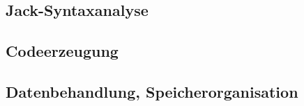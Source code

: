 \documentclass[12pt]{report}
\begin{document}
\subsection{Jack-Syntaxanalyse}
\subsection{Codeerzeugung}
\subsection{Datenbehandlung, Speicherorganisation}












\end{document}
